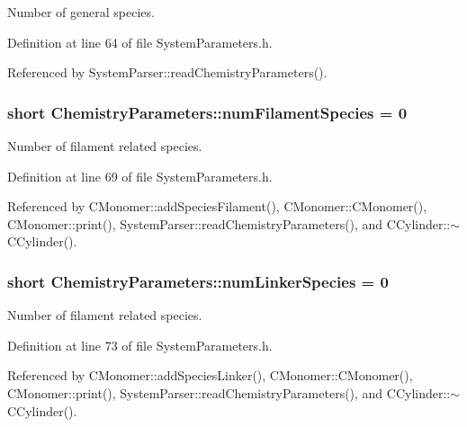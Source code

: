 Number of general species. 



Definition at line 64 of file System\+Parameters.\+h.



Referenced by System\+Parser\+::read\+Chemistry\+Parameters().

\hypertarget{structChemistryParameters_aa3ff68ed0be86482f1ea6d40b9d0fa1c}{
\subsubsection[{num\+Filament\+Species}]{\setlength{\rightskip}{0pt plus 5cm}short Chemistry\+Parameters\+::num\+Filament\+Species = 0}}\label{structChemistryParameters_aa3ff68ed0be86482f1ea6d40b9d0fa1c}


Number of filament related species. 



Definition at line 69 of file System\+Parameters.\+h.



Referenced by C\+Monomer\+::add\+Species\+Filament(), C\+Monomer\+::\+C\+Monomer(), C\+Monomer\+::print(), System\+Parser\+::read\+Chemistry\+Parameters(), and C\+Cylinder\+::$\sim$\+C\+Cylinder().

\hypertarget{structChemistryParameters_af82c8c5d13f1e092d9eb69a7e8e3b5a4}{
\subsubsection[{num\+Linker\+Species}]{\setlength{\rightskip}{0pt plus 5cm}short Chemistry\+Parameters\+::num\+Linker\+Species = 0}}\label{structChemistryParameters_af82c8c5d13f1e092d9eb69a7e8e3b5a4}


Number of filament related species. 



Definition at line 73 of file System\+Parameters.\+h.



Referenced by C\+Monomer\+::add\+Species\+Linker(), C\+Monomer\+::\+C\+Monomer(), C\+Monomer\+::print(), System\+Parser\+::read\+Chemistry\+Parameters(), and C\+Cylinder\+::$\sim$\+C\+Cylinder().

